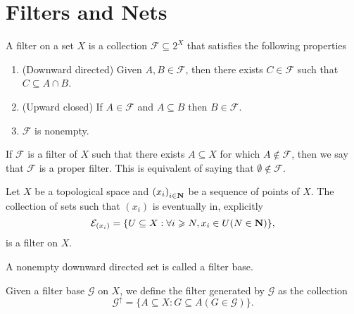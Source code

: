 \section{Filters and Nets}

\begin{definition}\label{def: filter}
  A filter on a set \(X\) is a collection \(\mathcal F \subseteq 2^X\) that
  satisfies the following properties
  \begin{enumerate}[(F1)]
    \item\label{def: filter F1}
      (Downward directed) Given \(A, B \in \mathcal F\), then there exists
      \(C \in \mathcal F\) such that \(C \subseteq A \cap B\).
    \item\label{def: filter F2}
      (Upward closed) If \(A \in \mathcal F\) and \(A \subseteq B\) then \(B
      \in \mathcal F\).
    \item\label{def: filter F3}
      \(\mathcal F\) is nonempty.
  \end{enumerate}
\end{definition}

\begin{definition}
  If \(\mathcal F\) is a filter of \(X\) such that there exists \(A \subseteq
  X\) for which \(A \not\in \mathcal F\), then we say that \(\mathcal F\) is a
  proper filter. This is equivalent of saying that \(\emptyset \not\in \mathcal
  F\).
\end{definition}

\begin{proposition}
  Let \(X\) be a topological space and \({(x_i)}_{i \in \mathbf{N}}\) be a
  sequence of points of \(X\). The collection of sets such that \((x_i)\) is
  eventually in, explicitly
  \[
    \mathcal E_{(x_i)} = \{U \subseteq X : \forall i \geqslant N, x_i \in U (N \in
    \mathbf{N})\},
  \]
  is a filter on \(X\).
\end{proposition}

\begin{definition}
  A nonempty downward directed set is called a filter base.
\end{definition}

\begin{proposition}
  Given a filter base \(\mathcal G\) on \(X\), we define the filter generated by
  \(\mathcal G\) as the collection
  \[
    \mathcal G^\uparrow = \{A \subseteq X : G \subseteq A (G \in \mathcal G)\}.
  \]
\end{proposition}

